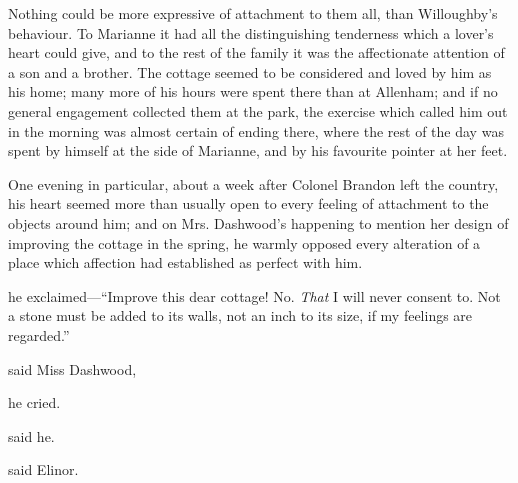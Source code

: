 Nothing could be more expressive of attachment to them all, than Willoughby's behaviour. To Marianne it had all the distinguishing tenderness which a lover's heart could give, and to the rest of the family it was the affectionate attention of a son and a brother. The cottage seemed to be considered and loved by him as his home; many more of his hours were spent there than at Allenham; and if no general engagement collected them at the park, the exercise which called him out in the morning was almost certain of ending there, where the rest of the day was spent by himself at the side of Marianne, and by his favourite pointer at her feet.

One evening in particular, about a week after Colonel Brandon left the country, his heart seemed more than usually open to every feeling of attachment to the objects around him; and on Mrs. Dashwood's happening to mention her design of improving the cottage in the spring, he warmly opposed every alteration of a place which affection had established as perfect with him.

 he exclaimed---“Improve this dear cottage! No. {\em That} I will never consent to. Not a stone must be added to its walls, not an inch to its size, if my feelings are regarded.”

 said Miss Dashwood, 

 he cried. 


 said he. 

 said Elinor.

